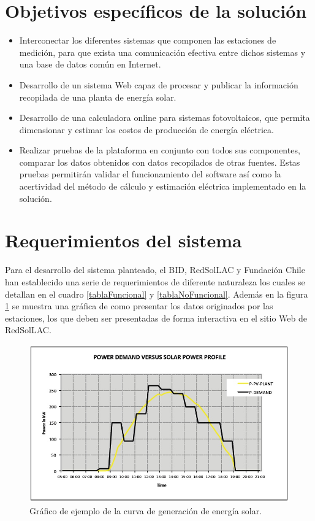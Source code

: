 \section{Objetivos específicos de la solución}
\begin{itemize}
\item Interconectar los diferentes sistemas que componen las estaciones de medición, para que exista una comunicación efectiva entre dichos sistemas y una base de datos común en Internet.
\item Desarrollo de un sistema Web capaz de procesar y publicar la información recopilada de una planta de energía solar.
\item Desarrollo de una calculadora online para sistemas fotovoltaicos, que permita dimensionar y estimar los costos de producción de energía eléctrica.
\item Realizar pruebas de la plataforma en conjunto con todos sus componentes, comparar los datos obtenidos con datos recopilados de otras fuentes. Estas pruebas permitirán validar el funcionamiento del software así como la acertividad del método de cálculo y estimación eléctrica implementado en la solución.
\end{itemize}

\section{Requerimientos del sistema}
Para el desarrollo del sistema planteado, el BID, RedSolLAC y Fundación Chile han establecido una serie de requerimientos de diferente naturaleza los cuales se detallan en el cuadro \ref{tablaFuncional} y \ref{tablaNoFuncional}. Además en la figura \ref{fig:demanda} se muestra una gráfica de como presentar los datos originados por las estaciones, los que deben ser presentadas de forma interactiva en el sitio Web de RedSolLAC.

\begin{figure}[h!]
        \centering
        \includegraphics[scale=0.35]{images/demandaGeneracionSubSole}
        \caption{Gráfico de ejemplo de la curva de generación de energía solar.}
	\label{fig:demanda}
\end{figure}
\newpage

